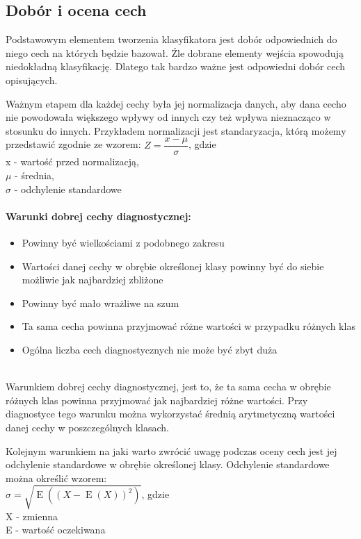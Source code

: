 \documentclass[a4paper,12pt,twoside,openany]{report}
\begin{document}
\subsection{Dobór i ocena cech}
Podstawowym elementem tworzenia klasyfikatora jest dobór odpowiednich do niego cech na których będzie bazował. Źle dobrane elementy wejścia spowodują niedokładną klasyfikację. Dlatego tak bardzo ważne jest odpowiedni dobór cech opisujących.

Ważnym etapem dla każdej cechy była jej normalizacja danych, aby dana cecho nie powodowała większego wpływy od innych czy też wpływa nieznacząco w stosunku do innych. Przykładem normalizacji jest standaryzacja, którą możemy przedstawić zgodnie ze wzorem: $ Z = \dfrac{x - \mu}{\sigma} $, gdzie 
\\ x - wartość przed normalizacją, \\ $\mu$ - średnia, \\ $\sigma$ - odchylenie standardowe

\paragraph{Warunki dobrej cechy diagnostycznej: }
\begin{itemize}
	\item Powinny być wielkościami z podobnego zakresu
	\item Wartości danej cechy w obrębie określonej klasy powinny być do siebie możliwie jak najbardziej zbliżone
	\item Powinny być mało wrażliwe na szum
	\item Ta sama cecha powinna przyjmować różne wartości w przypadku różnych klas
	\item Ogólna liczba cech diagnostycznych nie może być zbyt duża
\end{itemize}
\mbox{} \\
Warunkiem dobrej cechy diagnostycznej, jest to, że ta sama cecha w obrębie różnych klas powinna przyjmować jak najbardziej różne wartości. Przy diagnostyce tego warunku można wykorzystać średnią arytmetyczną wartości danej cechy w poszczególnych klasach.

Kolejnym warunkiem na jaki warto zwrócić uwagę podczas oceny cech jest jej odchylenie standardowe w obrębie określonej klasy. Odchylenie standardowe można określić wzorem: \\
$ \sigma = {\sqrt {\operatorname {E} ((X-\operatorname {E} (X))^{2})}} $, gdzie \\
X - zmienna \\
E - wartość oczekiwana \\
\end{document}
